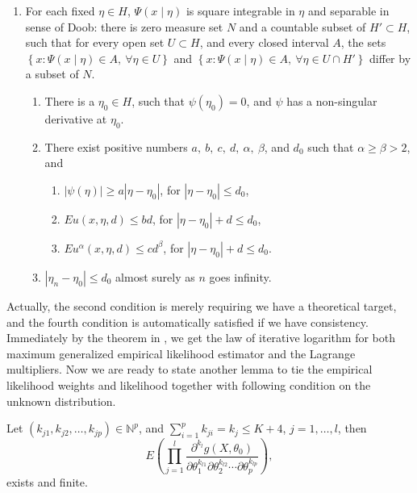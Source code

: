 \begin{enumerate}
\item For each fixed $\eta\in H$, $\Psi\left(x\mid\eta\right)$ is square
integrable in $\eta$ and separable in sense of Doob: there is zero
measure set $N$ and a countable subset of $H'\subset H$, such that
for every open set $U\subset H$, and every closed interval $A$,
the sets $\left\{ x:\Psi\left(x\mid\eta\right)\in A,\:\forall\eta\in U\right\} $
and $\left\{ x:\Psi\left(x\mid\eta\right)\in A,\:\forall\eta\in U\cap H'\right\} $
differ by a subset of $N$.

\begin{enumerate}
\item There is a $\eta_{0}\in H$, such that $\psi\left(\eta_{0}\right)=0$,
and $\psi$ has a non-singular derivative at $\eta_{0}$.
\item There exist positive numbers $a,\: b,\: c,\: d,\:\alpha,\:\beta$,
and $d_{0}$ such that $\alpha\ge\beta>2$, and 

\begin{enumerate}
\item $\left|\psi\left(\eta\right)\right|\ge a\left|\eta-\eta_{0}\right|$,
for $\left|\eta-\eta_{0}\right|\le d_{0}$,
\item $Eu\left(x,\eta,d\right)\le bd$, for $\left|\eta-\eta_{0}\right|+d\le d_{0}$,
\item $Eu^{\alpha}\left(x,\eta,d\right)\le cd^{\beta}$, for $\left|\eta-\eta_{0}\right|+d\le d_{0}$.
\end{enumerate}
\item $\left|\eta_{n}-\eta_{0}\right|\le d_{0}$ almost surely as $n$ goes
infinity.
\end{enumerate}
\end{enumerate}
Actually, the second condition is merely requiring we have a theoretical
target, and the fourth condition is automatically satisfied if we
have consistency. Immediately by the theorem in \citet{he1995law},
we get the law of iterative logarithm for both maximum generalized
empirical likelihood estimator and the Lagrange multipliers. Now we
are ready to state another lemma to tie the empirical likelihood weights
and likelihood together with following condition on the unknown distribution.
\begin{assumption}
\label{assu:finite-theoretic-moment} Let $\left(k_{j1},k_{j2},\ldots,k_{jp}\right)\in\mathbb{N}^{p}$,
and $\sum_{i=1}^{p}k_{ji}=k_{j}\le K+4$, $j=1,\ldots,l$, then 
\[
E\left(\prod_{j=1}^{l}\frac{\partial^{k_{l}}g\left(X,\theta_{0}\right)}{\partial\theta_{1}^{k_{l1}}\partial\theta_{2}^{k_{l2}}\cdots\partial\theta_{p}^{k_{lp}}}\right),
\]
exists and finite.\end{assumption}
